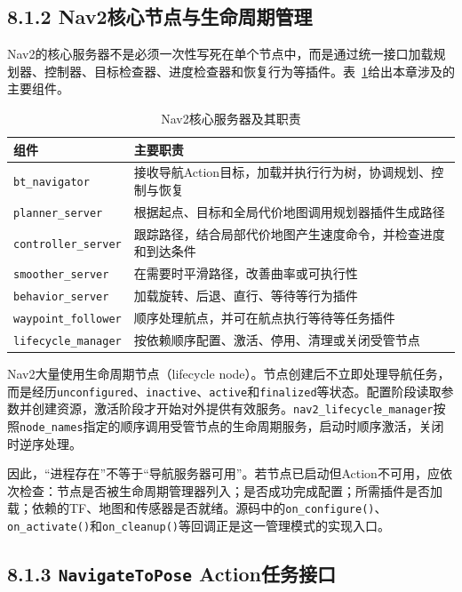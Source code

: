 \documentclass[UTF8,zihao=-4]{ctexart}
\begin{document}
\subsection*{8.1.2 Nav2核心节点与生命周期管理}

Nav2的核心服务器不是必须一次性写死在单个节点中，而是通过统一接口加载规划器、控制器、目标检查器、进度检查器和恢复行为等插件。表~\ref{tab:nav2-core-servers}给出本章涉及的主要组件。

\begin{table}[htbp]
  \centering
  \caption{Nav2核心服务器及其职责}
  \label{tab:nav2-core-servers}
  \begin{tabular}{p{}p{}}
    \toprule
    组件 & 主要职责 \\
    \midrule
    \texttt{bt\_navigator} & 接收导航Action目标，加载并执行行为树，协调规划、控制与恢复 \\
    \texttt{planner\_server} & 根据起点、目标和全局代价地图调用规划器插件生成路径 \\
    \texttt{controller\_server} & 跟踪路径，结合局部代价地图产生速度命令，并检查进度和到达条件 \\
    \texttt{smoother\_server} & 在需要时平滑路径，改善曲率或可执行性 \\
    \texttt{behavior\_server} & 加载旋转、后退、直行、等待等行为插件 \\
    \texttt{waypoint\_follower} & 顺序处理航点，并可在航点执行等待等任务插件 \\
    \texttt{lifecycle\_manager} & 按依赖顺序配置、激活、停用、清理或关闭受管节点 \\
    \bottomrule
  \end{tabular}
\end{table}

Nav2大量使用生命周期节点（lifecycle node）。节点创建后不立即处理导航任务，而是经历\texttt{unconfigured}、\texttt{inactive}、\texttt{active}和\texttt{finalized}等状态。配置阶段读取参数并创建资源，激活阶段才开始对外提供有效服务。\texttt{nav2\_lifecycle\_manager}按照\texttt{node\_names}指定的顺序调用受管节点的生命周期服务，启动时顺序激活，关闭时逆序处理\cite{navigation2source}。

因此，“进程存在”不等于“导航服务器可用”。若节点已启动但Action不可用，应依次检查：节点是否被生命周期管理器列入；是否成功完成配置；所需插件是否加载；依赖的TF、地图和传感器是否就绪。源码中的\texttt{on\_configure()}、\texttt{on\_activate()}和\texttt{on\_cleanup()}等回调正是这一管理模式的实现入口。

\subsection*{8.1.3 \texttt{NavigateToPose} Action任务接口}
\end{document}
